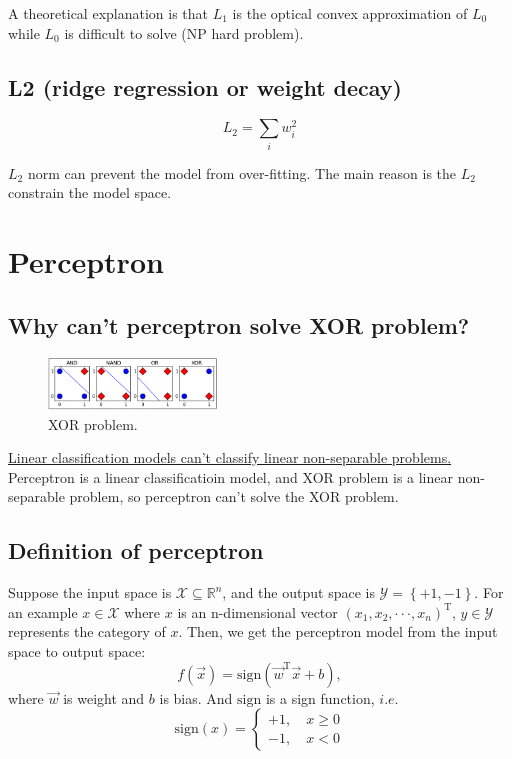 \documentclass[10pt,onecolumn]{book}
\begin{document}
A theoretical explanation is that $L_1$ is the optical convex approximation of $L_0$ while $L_0$ is difficult to solve (NP hard problem). 



\subsection{L2 (ridge regression or weight decay)}
\begin{equation}
L_2 = \sum_i w_i^2
\end{equation}

$L_2$ norm can prevent the model from over-fitting. The main reason is the $L_2$ constrain the model space.

\section{Perceptron}
\subsection{Why can't perceptron solve XOR problem?}
\label{sect:perceptron}
\begin{figure}[h]
\centering
\includegraphics[width=0.4\textwidth]{figures/XOR_problem.png}
\caption{XOR problem.}
\end{figure}
 \uline{Linear classification models can't classify linear non-separable problems.} Perceptron is a linear classificatioin model, and XOR problem is a linear non-separable problem, so perceptron can't solve the XOR problem.

\subsection{Definition of perceptron}
Suppose the input space is $\mathcal{X} \subseteq \mathbb{R}^n$, and the output space is $\mathcal{Y} = \left\{+1, -1\right\}$. For an example $x \in \mathcal{X}$ where $x$ is an n-dimensional vector $(x_{1}, x_{2}, \cdot \cdot \cdot, x_{n})^\mathrm{T}$, $y \in \mathcal{Y}$ represents the category of $x$. Then, we get the perceptron model from the input space to output space: 
\begin{equation}
f(\vec{x}) = \mathrm{sign}(\vec{w}^\mathrm{T} \vec{x} + b),
\end{equation}
where $\vec{w}$ is weight and $b$ is bias. And $\mathrm{sign}$ is a sign function, $i. e.$
\begin{equation}
\mathrm{sign}(x)=
\left\{
	\begin{array}{ll}
		+1, \quad x \ge 0  \\
		-1, \quad x < 0
	\end{array}
\right.
\end{equation}
\end{document}
